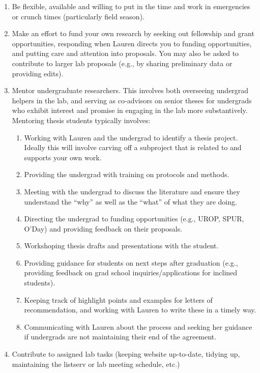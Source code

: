 \documentclass[12pt]{article}
\begin{document}
\begin{enumerate}
\item Be flexible, available and willing to put in the time and work in emergencies or crunch times (particularly field season).

\item Make an effort to fund your own research by seeking out fellowship and grant opportunities, responding when Lauren directs you to funding opportunities, and putting care and attention into proposals. You may also be asked to contribute to larger lab proposals (e.g., by sharing preliminary data or providing edits).
  
\item Mentor undergraduate researchers. This involves both overseeing undergrad helpers in the lab, and serving as co-advisors on senior theses for undergrads who exhibit interest and promise in engaging in the lab more substantively. Mentoring thesis students typically involves:
\begin{enumerate}
\item Working with Lauren and the undergrad to identify a thesis project. Ideally this will involve carving off a subproject that is related to and supports your own work.
\item Providing the undergrad with training on protocols and methods.
\item Meeting with the undergrad to discuss the literature and ensure they understand the ``why'' as well as the ``what'' of what they are doing.
\item Directing the undergrad to funding opportunities (e.g., UROP, SPUR, O'Day) and providing feedback on their proposals.
\item Workshoping thesis drafts and presentations with the student.
\item Providing guidance for students on next steps after graduation (e.g., providing feedback on grad school inquiries/applications for inclined students).
\item Keeping track of highlight points and examples for letters of recommendation, and working with Lauren to write these in a timely way.
\item Communicating with Lauren about the process and seeking her guidance if undergrads are not maintaining their end of the agreement.
\end{enumerate}

\item Contribute to assigned lab tasks (keeping website up-to-date, tidying up, maintaining the listserv or lab meeting schedule, etc.)


\end{enumerate}
\end{document}
